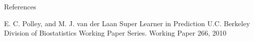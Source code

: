 
\appendix
\begin{frame}[allowframebreaks]{References}
\begin{thebibliography}{9}
	 E. C. Polley, and M. J. van der Laan
	\newblock Super Learner in Prediction
	\newblock U.C. Berkeley Division of Biostatistics Working Paper Series. Working Paper 266, 2010
\end{thebibliography}
\end{frame}
